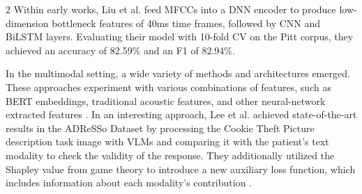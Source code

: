 \documentclass[10pt]{article}
\begin{document}
\begin{multicols}{2}
Within early works, Liu et al. \cite{liuDetectingAlzheimersDisease2021} feed
MFCCs into a DNN encoder to produce low-dimension bottleneck features of 40ms
time frames, followed by CNN and BiLSTM layers. Evaluating their model with
10-fold CV on the Pitt corpus, they achieved an accuracy of 82.59\% and an F1
of 82.94\%. \par In the multimodal setting, a wide variety of methods and
architectures emerged. These approaches experiment with various combinations of
features, such as BERT embeddings, traditional acoustic features, and other
neural-network extracted features \cite{iliasMultimodalApproachDementia2022,
iliasMultimodalDeepLearning2022a, panSwinBERTFeatureFusion2024,
chengCogniVoiceMultimodalMultilingual2024, linMultimodalDeepLearning2024}. In
an interesting approach, Lee et al. achieved state-of-the-art results in the
ADReSSo Dataset by processing the Cookie Theft Picture description task image
with VLMs and comparing it with the patient's text modality to check the
validity of the response. They additionally utilized the Shapley value from
game theory to introduce a new auxiliary loss function, which includes
information about each modality's contribution
\cite{leeMultimodalAlzheimersDisease2025}.


\end{multicols}
\end{document}
